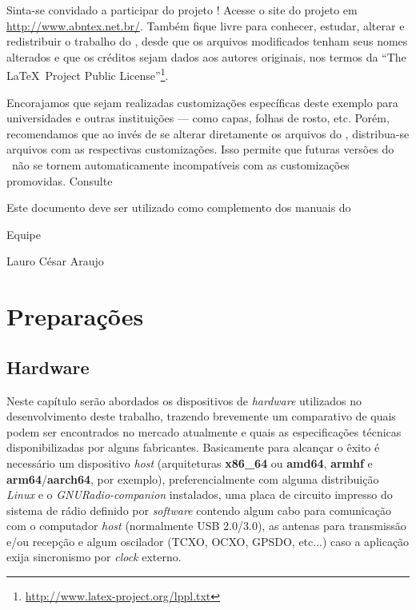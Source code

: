 \documentclass[
  12pt,				%
  openright,			%
  twoside,			%
  a4paper,			%
  english,			%
  french,				%
  spanish,			%
  brazil,				%
  ]{abntex2}
\begin{document}
Sinta-se convidado a participar do projeto \abnTeX! Acesse o site do projeto em
\url{http://www.abntex.net.br/}. Também fique livre para conhecer,
estudar, alterar e redistribuir o trabalho do \abnTeX, desde que os arquivos
modificados tenham seus nomes alterados e que os créditos sejam dados aos
autores originais, nos termos da ``The \LaTeX\ Project Public
License''\footnote{\url{http://www.latex-project.org/lppl.txt}}.

Encorajamos que sejam realizadas customizações específicas deste exemplo para
universidades e outras instituições --- como capas, folhas de rosto, etc.
Porém, recomendamos que ao invés de se alterar diretamente os arquivos do
\abnTeX, distribua-se arquivos com as respectivas customizações.
Isso permite que futuras versões do \abnTeX~não se tornem automaticamente
incompatíveis com as customizações promovidas. Consulte

Este documento deve ser utilizado como complemento dos manuais do \abnTeX\

Equipe \abnTeX

Lauro César Araujo


\part{Preparações}

\chapter{Hardware}

Neste capítulo serão abordados os dispositivos de \textit{hardware} utilizados no desenvolvimento deste trabalho, trazendo brevemente um comparativo de quais
podem ser encontrados no mercado atualmente e quais as especificações técnicas disponibilizadas por alguns fabricantes. Basicamente para alcançar o êxito
é necessário um dispositivo \textit{host} (arquiteturas \textbf{x86\_64} ou \textbf{amd64}, \textbf{armhf} e \textbf{arm64}/\textbf{aarch64}, por exemplo),
preferencialmente com alguma distribuição \textit{Linux} e o \textit{GNURadio-companion} instalados, uma placa de circuito impresso do sistema de rádio
definido por \textit{software} contendo algum cabo para comunicação com o computador \textit{host} (normalmente USB 2.0/3.0), as antenas para transmissão e/ou recepção
e algum oscilador (TCXO, OCXO, GPSDO, etc...)
caso a aplicação exija sincronismo por \textit{clock} externo.
\end{document}
